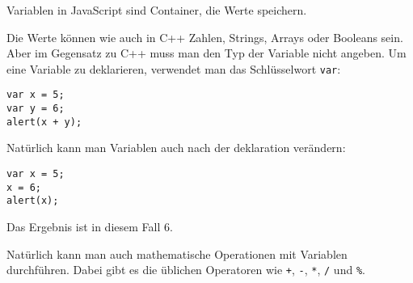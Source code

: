\documentclass[a4paper,14pt]{extarticle}
\begin{document}


Variablen in JavaScript sind Container, die Werte speichern.

Die Werte können wie auch in C++ Zahlen, Strings, Arrays oder Booleans sein. Aber im Gegensatz zu C++ muss man den Typ der Variable nicht angeben. Um eine Variable zu deklarieren, verwendet man das Schlüsselwort \texttt{var}:

\begin{verbatim}
var x = 5;
var y = 6;
alert(x + y);
\end{verbatim}


Natürlich kann man Variablen auch nach der deklaration verändern:

\begin{verbatim}
var x = 5;
x = 6;
alert(x);
\end{verbatim}

Das Ergebnis ist in diesem Fall 6.

Natürlich kann man auch mathematische Operationen mit Variablen durchführen. Dabei gibt es die üblichen Operatoren wie \texttt{+}, \texttt{-}, \texttt{*}, \texttt{/} und \texttt{\%}.

\end{document}
